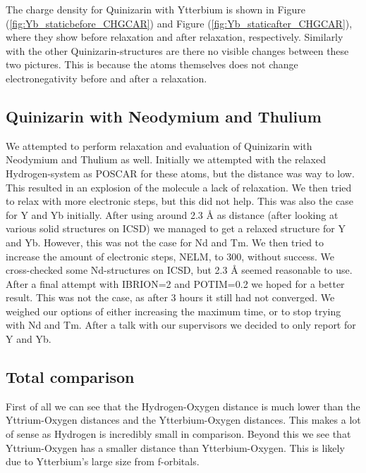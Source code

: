 \documentclass{article}
\begin{document}
    The charge density for Quinizarin with Ytterbium is shown in Figure (\ref{fig:Yb_staticbefore_CHGCAR}) and Figure (\ref{fig:Yb_staticafter_CHGCAR}), where they show before relaxation and after relaxation, respectively. Similarly with the other Quinizarin-structures are there no visible changes between these two pictures. This is because the atoms themselves does not change electronegativity before and after a relaxation. \\

  \subsection{Quinizarin with Neodymium and Thulium}

    We attempted to perform relaxation and evaluation of Quinizarin with Neodymium and Thulium as well. Initially we attempted with the relaxed Hydrogen-system as POSCAR for these atoms, but the distance was way to low. This resulted in an explosion of the molecule a lack of relaxation. We then tried to relax with more electronic steps, but this did not help. This was also the case for Y and Yb initially. After using around 2.3 Å as distance (after looking at various solid structures on ICSD) we managed to get a relaxed structure for Y and Yb. However, this was not the case for Nd and Tm. We then tried to increase the amount of electronic steps, NELM, to 300, without success. We cross-checked some Nd-structures on ICSD, but 2.3 Å seemed reasonable to use. After a final attempt with IBRION=2 and POTIM=0.2 we hoped for a better result. This was not the case, as after 3 hours it still had not converged. We weighed our options of either increasing the maximum time, or to stop trying with Nd and Tm. After a talk with our supervisors we decided to only report for Y and Yb. \\

  \subsection{Total comparison}

    First of all we can see that the Hydrogen-Oxygen distance is much lower than the Yttrium-Oxygen distances and the Ytterbium-Oxygen distances. This makes a lot of sense as Hydrogen is incredibly small in comparison. Beyond this we see that Yttrium-Oxygen has a smaller distance than Ytterbium-Oxygen. This is likely due to Ytterbium's large size from f-orbitals. \\
\end{document}
